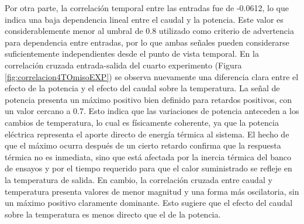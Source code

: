 \documentclass[11pt]{report}
\begin{document}
Por otra parte, la correlación temporal entre las entradas fue de -0.0612, lo que indica una baja dependencia lineal entre el caudal y la potencia. Este valor es considerablemente menor al umbral de 0.8 utilizado como criterio de advertencia para dependencia entre entradas, por lo que ambas señales pueden considerarse suficientemente independientes desde el punto de vista temporal. 
En la correlación cruzada entrada-salida del cuarto experimento (Figura \ref{fig:correlacion4TOmisoEXP}) se observa nuevamente una diferencia clara entre el efecto de la potencia y el efecto del caudal sobre la temperatura. La señal de potencia presenta un máximo positivo bien definido para retardos positivos, con un valor cercano a 0.7. Esto indica que las variaciones de potencia anteceden a los cambios de temperatura, lo cual es físicamente coherente, ya que la potencia eléctrica representa el aporte directo de energía térmica al sistema. El hecho de que el máximo ocurra después de un cierto retardo confirma que la respuesta térmica no es inmediata, sino que está afectada por la inercia térmica del banco de ensayos y por el tiempo requerido para que el calor suministrado se refleje en la temperatura de salida. En cambio, la correlación cruzada entre caudal y temperatura presenta valores de menor magnitud y una forma más oscilatoria, sin un máximo positivo claramente dominante. Esto sugiere que el efecto del caudal sobre la temperatura es menos directo que el de la potencia.
\end{document}
